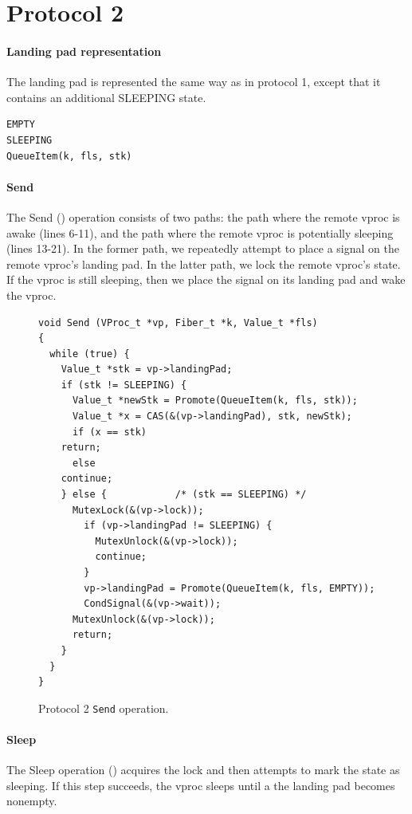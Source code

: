 \documentclass[11pt]{article}
\begin{document}
\section{Protocol 2}\label{sec:protocol2}

\paragraph{Landing pad representation}
The landing pad is represented the same way as in protocol 1, except that it 
contains an additional SLEEPING state.
\lstset{language=C}
\lstset{commentstyle=\textit}
\begin{lstlisting}
EMPTY
SLEEPING
QueueItem(k, fls, stk)
\end{lstlisting}

\paragraph{Send}
The Send () operation consists of two paths: the path where the remote vproc
is awake (lines 6-11), and the path where the remote vproc is potentially
sleeping (lines 13-21).
In the former path, we repeatedly attempt to place a signal on the remote
vproc's landing pad.
In the latter path, we lock the remote vproc's state.
If the vproc is still sleeping, then we place the signal on its landing
pad and wake the vproc.

\begin{figure}
\lstset{language=C}
\lstset{commentstyle=\textit}
\lstset{numbers=left}
\begin{lstlisting}
void Send (VProc_t *vp, Fiber_t *k, Value_t *fls)
{
  while (true) {
    Value_t *stk = vp->landingPad;
    if (stk != SLEEPING) {
      Value_t *newStk = Promote(QueueItem(k, fls, stk));
      Value_t *x = CAS(&(vp->landingPad), stk, newStk);
      if (x == stk)
	return;
      else
	continue;
    } else {            /* (stk == SLEEPING) */
      MutexLock(&(vp->lock));
        if (vp->landingPad != SLEEPING) {
          MutexUnlock(&(vp->lock));
          continue;
        }
        vp->landingPad = Promote(QueueItem(k, fls, EMPTY));
        CondSignal(&(vp->wait));
      MutexUnlock(&(vp->lock));
      return;
    }
  }
}
\end{lstlisting}
\caption{Protocol 2 \texttt{Send} operation.}\label{fig:protocol2-send}
\end{figure}

\paragraph{Sleep}
The Sleep operation () acquires the lock
and then attempts to mark the state as sleeping.
If this step succeeds, the vproc sleeps until a the landing pad becomes
nonempty.
\end{document}
